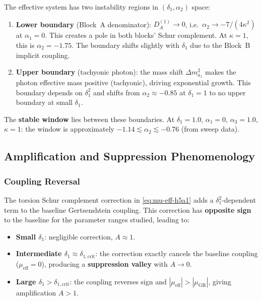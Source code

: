 The effective system has two instability regions in $(\delta_1, \alpha_2)$ space:
\begin{enumerate}
  \item \textbf{Lower boundary} (Block~A denominator): $D_A^{(1)} \to 0$, i.e.\ $\alpha_2 \to -7/(4\kappa^2)$ at $\alpha_1 = 0$. This creates a pole in both blocks' Schur complement. At $\kappa = 1$, this is $\alpha_2 = -1.75$. The boundary shifts slightly with $\delta_1$ due to the Block~B implicit coupling.
  \item \textbf{Upper boundary} (tachyonic photon): the mass shift $\Delta m^2_{a_1}$ makes the photon effective mass positive (tachyonic), driving exponential growth. This boundary depends on $\delta_1^2$ and shifts from $\alpha_2 \approx -0.85$ at $\delta_1 = 1$ to no upper boundary at small $\delta_1$.
\end{enumerate}

The \textbf{stable window} lies between these boundaries. At $\delta_1 = 1.0$, $\alpha_1 = 0$, $\alpha_3 = 1.0$, $\kappa = 1$: the window is approximately $-1.14 \lesssim \alpha_2 \lesssim -0.76$ (from sweep data).

\subsection{Amplification and Suppression Phenomenology}
\label{subsec:phenomenology}

\subsubsection{Coupling Reversal}

The torsion Schur complement correction in \cref{eq:mu-eff-h5a1} adds a $\delta_1^2$-dependent term to the baseline Gertsenshtein coupling. This correction has \textbf{opposite sign} to the baseline for the parameter ranges studied, leading to:
\begin{itemize}
  \item \textbf{Small $\delta_1$}: negligible correction, $A \approx 1$.
  \item \textbf{Intermediate $\delta_1 \approx \delta_{1,\text{crit}}$}: the correction exactly cancels the baseline coupling ($\mu_{\text{eff}} = 0$), producing a \textbf{suppression valley} with $A \to 0$.
  \item \textbf{Large $\delta_1 > \delta_{1,\text{crit}}$}: the coupling reverses sign and $|\mu_{\text{eff}}| > |\mu_{\text{GR}}|$, giving amplification $A > 1$.
\end{itemize}

